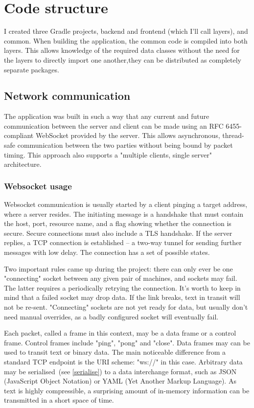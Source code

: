\chapter{Code structure}

I created three Gradle projects, backend and frontend (which I'll call layers), and common. When building the application, the common code is compiled into both layers. This allows knowledge of the required data classes without the need for the layers to directly import one another,they can be distributed as completely separate packages.

\section{Network communication}
The application was built in such a way that any current and future communication between the server and client can be made using an RFC 6455-compliant\cite{RFC6455} WebSocket provided by the server. This allows asynchronous, thread-safe communication between the two parties without being bound by packet timing. This approach also supports a "multiple clients, single server" architecture.

\subsection{Websocket usage}
Websocket communication is usually started by a client pinging a target address, where a server resides. The initiating message is a handshake that must contain the host, port, resource name, and a flag showing whether the connection is secure. Secure connections must also include a TLS handshake. If the server replies, a TCP connection is established -- a two-way tunnel for sending further messages with low delay. The connection has a set of possible states.

Two important rules came up during the project: there can only ever be one "connecting" socket between any given pair of machines, and sockets may fail. The latter requires a periodically retrying the connection. It's worth to keep in mind that a failed socket may drop data. If the link breaks, text in transit will not be re-sent. "Connecting" sockets are not yet ready for data, but usually don't need manual overrides, as a badly configured socket will eventually fail.

Each packet, called a frame in this context, may be a data frame or a control frame. Control frames include "ping", "pong" and "close". Data frames may can be used to transit text or binary data. The main noticeable difference from a standard TCP endpoint is the URI scheme: "ws://" in this case. Arbitrary data may be serialised~(see \ref{serialise}) to a data interchange format, such as JSON (JavaScript Object Notation) or YAML (Yet Another Markup Language). As text is highly compressible, a surprising amount of in-memory information can be transmitted in a short space of time.

